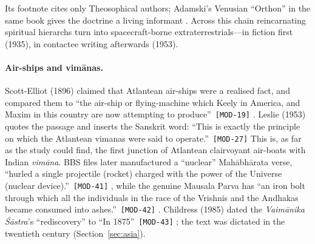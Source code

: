 \documentclass[11pt,a4paper]{article}
\newcommand{\pid}[1]{\texttt{\small #1}}
\begin{document}
Its footnote cites only Theosophical authors; Adamski's Venusian ``Orthon'' in the same book gives the doctrine a living informant \parencite{leslieadamski1953landed}. Across this chain reincarnating spiritual hierarchs turn into spacecraft-borne extraterrestrials---in fiction first (1935), in contactee writing afterwards (1953).

\paragraph{Air-ships and vimānas.} Scott-Elliot (1896) claimed that Atlantean air-ships were a realised fact, and compared them to \enquote{the air-ship or flying-machine which Keely in America, and Maxim in this country are now attempting to produce}~\pid{[MOD-19]} \parencite{scottelliot1896atlantis}. Leslie (1953) quotes the passage and inserts the Sanskrit word: \enquote{This is exactly the principle on which the Atlantean vimanas were said to operate.}~\pid{[MOD-27]} This is, as far as the study could find, the first junction of Atlantean clairvoyant air-boats with Indian \emph{vimāna}. BBS files later manufactured a ``nuclear'' Mahābhārata verse, \enquote{hurled a single projectile (rocket) charged with the power of the Universe (nuclear device).}~\pid{[MOD-41]} \parencite{hartman1993ourpast}, while the genuine Mausala Parva has \enquote{an iron bolt through which all the individuals in the race of the Vrishnis and the Andhakas became consumed into ashes.}~\pid{[MOD-42]} \parencite{ganguli1883mahabharata}. Childress (1985) dated the \emph{Vaimānika Śāstra}'s ``rediscovery'' to \enquote{In 1875}~\pid{[MOD-43]} \parencite{childress_aircraft}; the text was dictated in the twentieth century (Section~\ref{sec:asia}).
\end{document}
